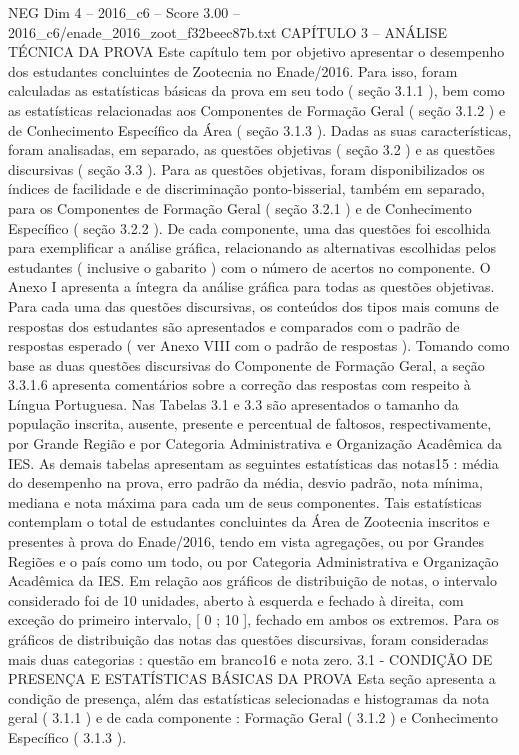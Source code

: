 \begin{textsample}{NEG Dim 4 – 2016\_c6 – Score 3.00 – 2016\_c6/enade\_2016\_zoot\_f32beec87b.txt}  \label{ex:f4_neg_304}
CAPÍTULO 3 – ANÁLISE TÉCNICA DA PROVA Este capítulo tem por objetivo apresentar o desempenho dos estudantes concluintes de Zootecnia no Enade/2016.
Para isso, foram calculadas as estatísticas básicas da prova em seu todo ( seção 3.1.1 ), bem como as estatísticas relacionadas aos Componentes de Formação Geral ( seção 3.1.2 ) e de Conhecimento Específico da Área ( seção 3.1.3 ).
Dadas as suas características, foram analisadas, em separado, as questões objetivas ( seção 3.2 ) e as questões discursivas ( seção 3.3 ).
Para as questões objetivas, foram disponibilizados os índices de facilidade e de discriminação ponto-bisserial, também em separado, para os Componentes de Formação Geral ( seção 3.2.1 ) e de Conhecimento Específico ( seção 3.2.2 ).
De cada componente, uma das questões foi escolhida para exemplificar a análise gráfica, relacionando as alternativas escolhidas pelos estudantes ( inclusive o gabarito ) com o número de acertos no componente.
O Anexo I apresenta a íntegra da análise gráfica para todas as questões objetivas.
Para cada uma das questões discursivas, os conteúdos dos tipos mais comuns de respostas dos estudantes são apresentados e comparados com o padrão de respostas esperado ( ver Anexo VIII com o padrão de respostas ).
Tomando como base as duas questões discursivas do Componente de Formação Geral, a seção 3.3.1.6 apresenta comentários sobre a correção das respostas com respeito à Língua Portuguesa.
Nas Tabelas 3.1 e 3.3 são apresentados o tamanho da população inscrita, ausente, presente e percentual de faltosos, respectivamente, por Grande Região e por Categoria Administrativa e Organização Acadêmica da IES.
As demais tabelas apresentam as seguintes estatísticas das notas15 : média do desempenho na prova, erro padrão da média, desvio padrão, nota mínima, mediana e nota máxima para cada um de seus componentes.
Tais estatísticas contemplam o total de estudantes concluintes da Área de Zootecnia inscritos e presentes à prova do Enade/2016, tendo em vista agregações, ou por Grandes Regiões e o país como um todo, ou por Categoria Administrativa e Organização Acadêmica da IES.
Em relação aos gráficos de distribuição de notas, o intervalo considerado foi de 10 unidades, aberto à esquerda e fechado à direita, com exceção do primeiro intervalo, [ 0 ; 10 ], fechado em ambos os extremos.
Para os gráficos de distribuição das notas das questões discursivas, foram consideradas mais duas categorias : questão em branco16 e nota zero. 3.1 - CONDIÇÃO DE PRESENÇA E ESTATÍSTICAS BÁSICAS DA PROVA Esta seção apresenta a condição de presença, além das estatísticas selecionadas e histogramas da nota geral ( 3.1.1 ) e de cada componente : Formação Geral ( 3.1.2 ) e Conhecimento Específico ( 3.1.3 ).

\end{textsample}

